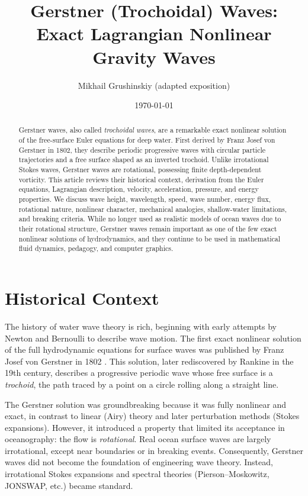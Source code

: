 \documentclass[11pt]{article}
\title{Gerstner (Trochoidal) Waves: \\
Exact Lagrangian Nonlinear Gravity Waves}
\author{Mikhail Grushinskiy (adapted exposition)}
\date{\today}
\begin{document}
\maketitle

\begin{abstract}
Gerstner waves, also called \emph{trochoidal waves}, are a remarkable exact nonlinear solution of the free-surface Euler equations for deep water. First derived by Franz Josef von Gerstner in 1802, they describe periodic progressive waves with circular particle trajectories and a free surface shaped as an inverted trochoid. Unlike irrotational Stokes waves, Gerstner waves are rotational, possessing finite depth-dependent vorticity. This article reviews their historical context, derivation from the Euler equations, Lagrangian description, velocity, acceleration, pressure, and energy properties. We discuss wave height, wavelength, speed, wave number, energy flux, rotational nature, nonlinear character, mechanical analogies, shallow-water limitations, and breaking criteria. While no longer used as realistic models of ocean waves due to their rotational structure, Gerstner waves remain important as one of the few exact nonlinear solutions of hydrodynamics, and they continue to be used in mathematical fluid dynamics, pedagogy, and computer graphics.
\end{abstract}

\tableofcontents

\section{Historical Context}
The history of water wave theory is rich, beginning with early attempts by Newton and Bernoulli to describe wave motion. The first exact nonlinear solution of the full hydrodynamic equations for surface waves was published by Franz Josef von Gerstner in 1802 \cite{gerstner1802}. This solution, later rediscovered by Rankine in the 19th century, describes a progressive periodic wave whose free surface is a \emph{trochoid}, the path traced by a point on a circle rolling along a straight line.

The Gerstner solution was groundbreaking because it was fully nonlinear and exact, in contrast to linear (Airy) theory and later perturbation methods (Stokes expansions). However, it introduced a property that limited its acceptance in oceanography: the flow is \emph{rotational}. Real ocean surface waves are largely irrotational, except near boundaries or in breaking events. Consequently, Gerstner waves did not become the foundation of engineering wave theory. Instead, irrotational Stokes expansions and spectral theories (Pierson–Moskowitz, JONSWAP, etc.) became standard.
\end{document}
